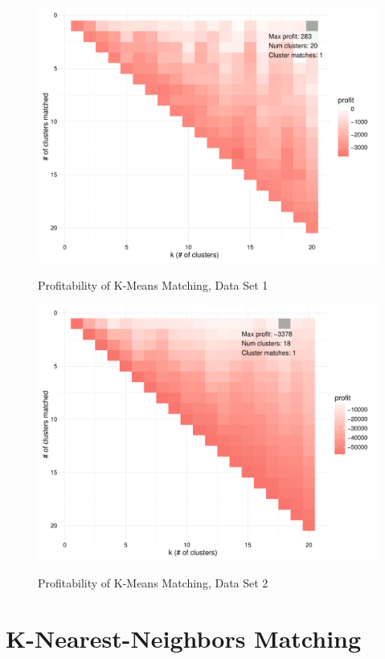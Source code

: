 \begin{figure}[!htb]
  \centering
  \caption{Profitability of K-Means Matching, Data Set 1}
  \includegraphics[scale=.5]{kmeans_profit1.pdf}
  \label{fig:kmeans_profit1}
\end{figure}

\begin{figure}[!htb]
  \centering
  \caption{Profitability of K-Means Matching, Data Set 2}
  \includegraphics[scale=.5]{kmeans_profit2.pdf}
  \label{fig:kmeans_profit2}
\end{figure}


\section{K-Nearest-Neighbors Matching}

